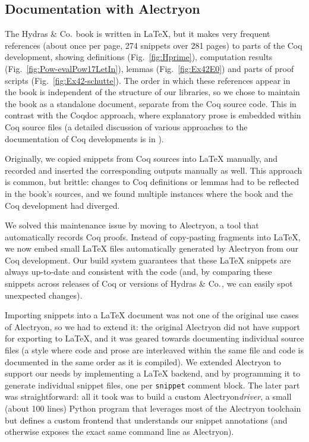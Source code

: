 \documentclass{easychair}
\newcommand{\coq}{Coq\xspace}
\newcommand{\alectr}{Alectryon\xspace}
\newcommand{\Hydras}{Hydras \& Co$\text.$\xspace}
\begin{document}
\subsection{Documentation with \alectr}

The \Hydras book is written in LaTeX, but it makes very frequent references (about once per page, 274 snippets over 281 pages) to parts of the \coq development, showing definitions (Fig.~\ref{fig:Hprime}), computation results (Fig.~\ref{fig:Pow-evalPow17LetIn}), lemmas (Fig.~\ref{fig:Ex42E0}) and parts of  proof scripts (Fig.~\ref{fig:Ex42-schutte}). The order in which these references appear in the book is independent of the structure of our libraries, so we chose to maintain the book as a standalone document, separate from the \coq source code.  This in contrast with the Coqdoc approach, where explanatory prose is embedded within \coq source files (a detailed discussion of various approaches to the documentation of \coq developments is in \cite{alectryonpaper}).

Originally, we copied snippets from \coq sources into LaTeX manually, and recorded and inserted the corresponding outputs manually as well.  This approach is common, but brittle: changes to \coq definitions or lemmas had to be reflected in the book's sources, and we found multiple instances where the book and the \coq development had diverged.
 
We solved this maintenance issue by moving to \alectr, a tool that automatically records \coq proofs.  Instead of copy-pasting fragments into LaTeX, we now embed small LaTeX files automatically generated by \alectr from our \coq development.  Our build system guarantees that these LaTeX snippets are always up-to-date and consistent with the code (and, by comparing these snippets across releases of \coq or versions of \Hydras, we can easily spot unexpected changes).

Importing snippets into a LaTeX document was not one of the original use cases of \alectr, so we had to extend it: the original \alectr did not have support for exporting to LaTeX, and it was geared towards documenting individual source files (a style where code and prose are interleaved within the same file and code is documented in the same order as it is compiled).  We extended \alectr to support our needs by implementing a LaTeX backend, and by programming it to generate individual snippet files, one per \texttt{snippet} comment block.  The later part was straightforward: all it took was to build a custom \alectr \textit{driver}, a small (about 100 lines) Python program that leverages most of the \alectr toolchain but defines a custom frontend that understands our snippet annotations (and otherwise exposes the exact same command line as \alectr).
\end{document}
